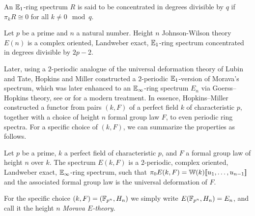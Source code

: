 \begin{definition}
    An $\mathbb{E}_1$-ring spectrum $R$ is said to be concentrated in degrees divisible by $q$ if $\pi_k R \cong 0$ for all $k \not = 0 \mod q$. 
\end{definition}

\begin{proposition}
    \label{ch0:prop:Johnson-Wilson-properties}
    Let $p$ be a prime and $n$ a natural number. Height $n$ Johnson-Wilson theory $E(n)$ is a complex oriented, Landweber exact, $\mathbb{E}_1$-ring spectrum concentrated in degrees divisible by $2p-2$. 
\end{proposition}

Later, using a $2$-periodic analogue of the universal deformation theory of Lubin and Tate, Hopkins and Miller constructed a $2$-periodic $\mathbb{E}_1$-version of Morava's spectrum, which was later enhanced to an $\mathbb{E}_\infty$-ring spectrum $E_n$ via Goerss--Hopkins theory, see \cite{goerss-hopkins_04} or \cite{pstragowski_vankoughnett_2022} for a modern treatment. In essence, Hopkins--Miller constructed a functor from pairs $(k, F)$ of a perfect field $k$ of characteristic $p$, together with a choice of height $n$ formal group law $F$, to even periodic ring spectra. For a specific choice of $(k, F)$, we can summarize the properties as follows.  

\begin{proposition}
    Let $p$ be a prime, $k$ a perfect field of characteristic $p$, and $F$ a formal group law of height $n$ over $k$. The spectrum $E(k,F)$ is a $2$-periodic, complex oriented, Landweber exact, $\mathbb{E}_\infty$-ring spectrum, such that $\pi_0 E(k,F)=\mathbb{W}(k)[\![ u_1, \ldots, u_{n-1}]\!]$ and the associated formal group law is the universal deformation of $F$. 
\end{proposition}




\begin{definition}
    For the specific choice $(k,F) = (\mathbb{F}_{p^n}, H_n)$ we simply write $E(\mathbb{F}_{p^n}, H_n) = E_n$, and call it the height $n$ \emph{Morava $E$-theory}. 
\end{definition}

